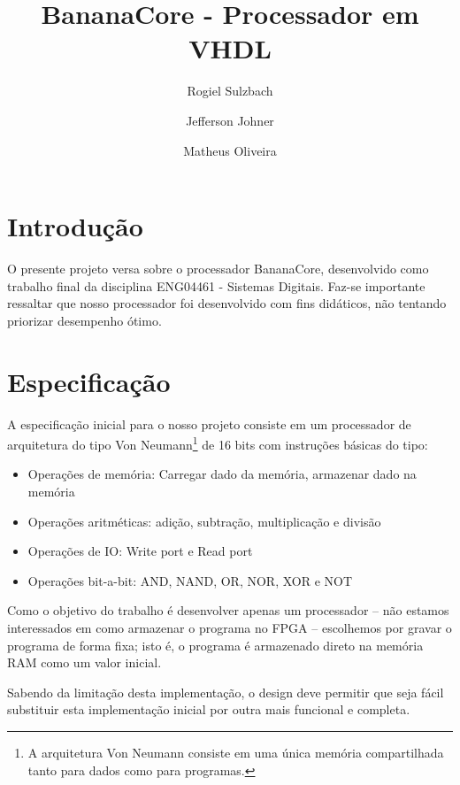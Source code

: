 \documentclass[11pt]{report}
\begin{document}
\title{BananaCore - Processador em VHDL}
\author{
  Rogiel Sulzbach\\
  \and
  Jefferson Johner\\
  \and
  Matheus Oliveira\\
}

\maketitle
\tableofcontents

\chapter{Introdução}

O presente projeto versa sobre o processador BananaCore, desenvolvido como trabalho final da disciplina ENG04461 - Sistemas Digitais. Faz-se importante ressaltar que nosso processador foi desenvolvido com fins didáticos, não tentando priorizar desempenho ótimo.

\chapter{Especificação}

A especificação inicial para o nosso projeto consiste em um processador de arquitetura do tipo Von Neumann\footnote{A arquitetura Von Neumann consiste em uma única memória compartilhada tanto para dados como para programas.} de 16 bits com instruções básicas do tipo:

\begin{itemize}
	\item Operações de memória: Carregar dado da memória, armazenar dado na memória
	\item Operações aritméticas: adição, subtração, multiplicação e divisão
	\item Operações de IO: Write port e Read port
	\item Operações bit-a-bit: AND, NAND, OR, NOR, XOR e NOT
\end{itemize}

Como o objetivo do trabalho é desenvolver apenas um processador -- não estamos interessados em como armazenar o programa no FPGA -- escolhemos por gravar o programa de forma fixa; isto é, o programa é armazenado direto na memória RAM como um valor inicial.

Sabendo da limitação desta implementação, o design deve permitir que seja fácil substituir esta implementação inicial por outra mais funcional e completa.
\end{document}
